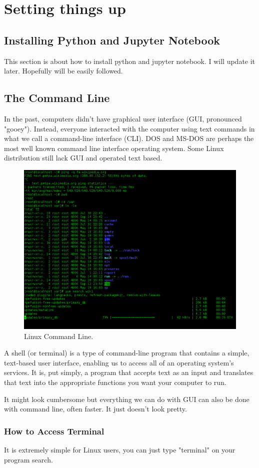 \chapter{Setting things up}
\section{Installing Python and Jupyter Notebook}
This section is about how to install python and jupyter notebook. I will update it later. Hopefully will be easily followed.
\section{The Command Line}
In the past, computers didn't have graphical user interface (GUI, pronounced "gooey"). Instead, everyone interacted with the computer using text commands in what we call a command-line interface (CLI). DOS and MS-DOS are perhaps the most well known command line interface operating system. Some Linux distribution still lack GUI and operated text based.
\begin{figure}[ht]
	\centering
	\includegraphics[width=0.5\linewidth]{Assets/Images/Linux_command-line._Bash._GNOME_Terminal._screenshot}
	\caption{Linux Command Line.}
	\label{fig:linuxcommand-line}
\end{figure}

\noindent A shell (or terminal) is a type of command-line program that contains a simple, text-based user interface, enabling us to access all of an operating system's services. It is, put simply, a program that accepts text as an input and translates that text into the appropriate functions you want your computer to run.

\noindent It might look cumbersome but everything we can do with GUI can also be done with command line, often faster. It just doesn't look pretty.
\subsection{How to Access Terminal}
It is extremely simple for Linux users, you can just type "terminal" on your program search.

